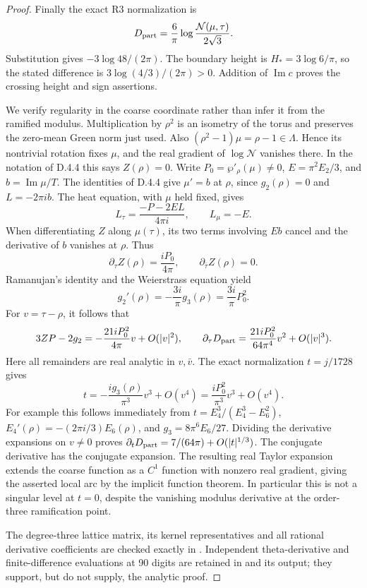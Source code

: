 \begin{proof}
Finally the exact R3 normalization is
\[
 D_{\rm part}=\frac6\pi
          \log\frac{\mathcal N(\mu,\tau)}{2\sqrt3}.
\]
Substitution gives \(-3\log48/(2\pi)\). The boundary height is
\(H_*=3\log6/\pi\), so the stated difference is
\(3\log(4/3)/(2\pi)>0\). Addition of \(\operatorname{Im}c\)
proves the crossing height and sign assertions.

We verify regularity in the coarse coordinate rather than infer it
from the ramified modulus. Multiplication by \(\rho^2\) is an
isometry of the torus and preserves the zero-mean Green norm just
used. Also \((\rho^2-1)\mu=\rho-1\in\Lambda\). Hence its
nontrivial rotation fixes \(\mu\), and the real gradient of
\(\log\mathcal N\) vanishes there. In the notation of D.4.4 this
says \(Z(\rho)=0\). Write \(P_0=\wp'_\rho(\mu)\ne0\),
\(E=\pi^2E_2/3\), and \(b=\operatorname{Im}\mu/T\).
The identities of D.4.4 give \(\mu'=b\) at \(\rho\), since
\(g_2(\rho)=0\) and \(L=-2\pi ib\). The heat equation, with
\(\mu\) held fixed, gives
\[
 L_\tau=\frac{-P-2EL}{4\pi i},\qquad L_\mu=-E.
\]
When differentiating \(Z\) along \(\mu(\tau)\), its two terms
involving \(E b\) cancel and the derivative of \(b\) vanishes at
\(\rho\). Thus
\[
 \partial_\tau Z(\rho)=\frac{iP_0}{4\pi},\qquad
 \partial_{\bar\tau}Z(\rho)=0.
\]
Ramanujan's identity and the Weierstrass equation yield
\[
 g_2'(\rho)=-\frac{3i}{\pi}g_3(\rho)
            =\frac{3i}{\pi}P_0^2.
\]
For \(v=\tau-\rho\), it follows that
\[
 3ZP-2g_2=-\frac{21iP_0^2}{4\pi}v+O(|v|^2),\qquad
 \partial_\tau D_{\rm part}
       =\frac{21iP_0^2}{64\pi^4}v^2+O(|v|^3).
\]
Here all remainders are real analytic in \(v,\bar v\).
The exact normalization \(t=j/1728\) gives
\[
 t=-\frac{i g_3(\rho)}{\pi^3}v^3+O(v^4)
   =\frac{iP_0^2}{\pi^3}v^3+O(v^4).
\]
For example this follows immediately from
\(t=E_4^3/(E_4^3-E_6^2)\),
\(E_4'(\rho)=-(2\pi i/3)E_6(\rho)\), and
\(g_3=8\pi^6E_6/27\). Dividing the derivative expansions on
\(v\ne0\) proves
\(\partial_tD_{\rm part}=7/(64\pi)+O(|t|^{1/3})\).
The conjugate derivative has the conjugate expansion. The resulting
real Taylor expansion extends the coarse function as a \(C^1\)
function with nonzero real gradient, giving the asserted local arc
by the implicit function theorem. In particular this is not a
singular level at \(t=0\), despite the vanishing modulus derivative
at the order-three ramification point.

The degree-three lattice matrix, its kernel representatives and all
rational derivative coefficients are checked exactly in
. Independent theta-derivative
and finite-difference evaluations at 90 digits are retained in
 and its output;
they support, but do not supply, the analytic proof.
\end{proof}

